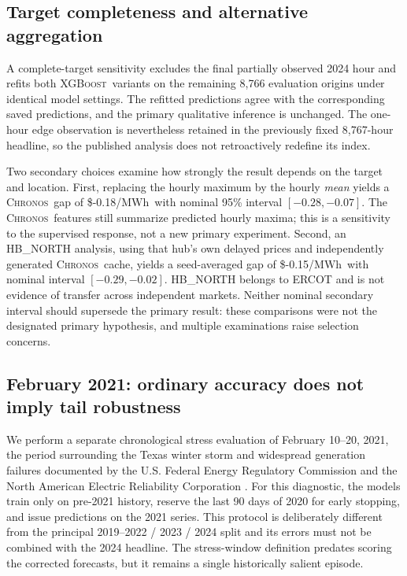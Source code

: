 \documentclass[11pt,letterpaper]{article}
\newcommand{\MWh}{\ensuremath{\mathrm{MWh}}}
\newcommand{\Chronos}{\textsc{Chronos}}
\newcommand{\XGB}{\textsc{XGBoost}}
\begin{document}
\subsection{Target completeness and alternative aggregation}
A complete-target sensitivity excludes the final partially observed 2024 hour and refits both \XGB\ variants on the remaining 8,766 evaluation origins under identical model settings. The refitted predictions agree with the corresponding saved predictions, and the primary qualitative inference is unchanged. The one-hour edge observation is nevertheless retained in the previously fixed 8,767-hour headline, so the published analysis does not retroactively redefine its index.

Two secondary choices examine how strongly the result depends on the target and location. First, replacing the hourly maximum by the hourly \emph{mean} yields a \Chronos\ gap of \$-0.18/\MWh\ with nominal 95\% interval $[-0.28,-0.07]$. The \Chronos\ features still summarize predicted hourly maxima; this is a sensitivity to the supervised response, not a new primary experiment. Second, an HB\_NORTH analysis, using that hub's own delayed prices and independently generated \Chronos\ cache, yields a seed-averaged gap of \$-0.15/\MWh\ with nominal interval $[-0.29,-0.02]$. HB\_NORTH belongs to ERCOT and is not evidence of transfer across independent markets. Neither nominal secondary interval should supersede the primary result: these comparisons were not the designated primary hypothesis, and multiple examinations raise selection concerns.

\subsection{February 2021: ordinary accuracy does not imply tail robustness}\label{subsec:crisis}
We perform a separate chronological stress evaluation of February 10--20, 2021, the period surrounding the Texas winter storm and widespread generation failures documented by the U.S. Federal Energy Regulatory Commission and the North American Electric Reliability Corporation \citep{ferc2021}. For this diagnostic, the models train only on pre-2021 history, reserve the last 90 days of 2020 for early stopping, and issue predictions on the 2021 series. This protocol is deliberately different from the principal 2019--2022 / 2023 / 2024 split and its errors must not be combined with the 2024 headline. The stress-window definition predates scoring the corrected forecasts, but it remains a single historically salient episode.
\end{document}
